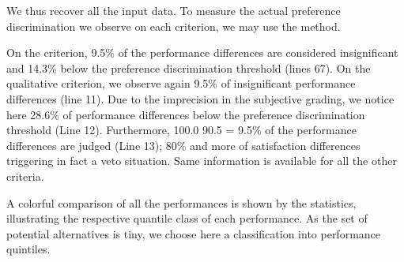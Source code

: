 \documentclass[a4paper,10pt,english]{sphinxhowto}
\begin{document}
We thus recover all the input data. To measure the actual preference discrimination we observe on each criterion, we may use the  method.

\begin{sphinxVerbatim}[commandchars=\\\{\},numbers=left,firstnumber=1,stepnumber=1]
\end{sphinxVerbatim}

On the  criterion, 9.5\% of the performance differences are considered insignificant and 14.3\% below the preference discrimination threshold (lines 6\sphinxhyphen{}7). On the qualitative  criterion, we observe again 9.5\% of insignificant performance differences (line 11). Due to the imprecision in the subjective grading, we notice here 28.6\% of performance differences below the preference discrimination threshold (Line 12). Furthermore, 100.0 \sphinxhyphen{} 90.5 = 9.5\% of the performance differences are judged  (Line 13); 80\% and more of satisfaction differences triggering in fact a veto situation. Same information is available for all the other criteria.

A colorful comparison of all the performances is shown by the  statistics, illustrating the respective quantile class of each performance. As the set of potential alternatives is tiny, we choose here a classification into performance quintiles.

\begin{sphinxVerbatim}[commandchars=\\\{\}]
\end{sphinxVerbatim}
\end{document}
